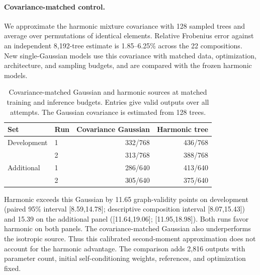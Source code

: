 \paragraph{Covariance-matched control.}
We approximate the harmonic mixture covariance with 128 sampled trees and average over permutations of identical elements. Relative Frobenius error against an independent 8,192-tree estimate is 1.85--6.25\% across the 22 compositions. New single-Gaussian models use this covariance with matched data, optimization, architecture, and sampling budgets, and are compared with the frozen harmonic models.

\begin{table}[t]
\centering
\caption{Covariance-matched Gaussian and harmonic sources at matched training and inference budgets. Entries give valid outputs over all attempts. The Gaussian covariance is estimated from 128 trees.}
\begin{tabular}{llrr}
\toprule
Set & Run & Covariance Gaussian & Harmonic tree\\
\midrule
Development & 1 &332/768&436/768\\
            & 2 &313/768&388/768\\
Additional  & 1 &286/640&413/640\\
            & 2 &305/640&375/640\\
\bottomrule
\end{tabular}\label{tab:covariance}
\end{table}

Harmonic exceeds this Gaussian by 11.65 graph-validity points on development (paired 95\% interval [8.59,14.78]; descriptive composition interval [8.07,15.43]) and 15.39 on the additional panel ([11.64,19.06]; [11.95,18.98]). Both runs favor harmonic on both panels. The covariance-matched Gaussian also underperforms the isotropic source. Thus this calibrated second-moment approximation does not account for the harmonic advantage. The comparison adds 2,816 outputs with parameter count, initial self-conditioning weights, references, and optimization fixed.
